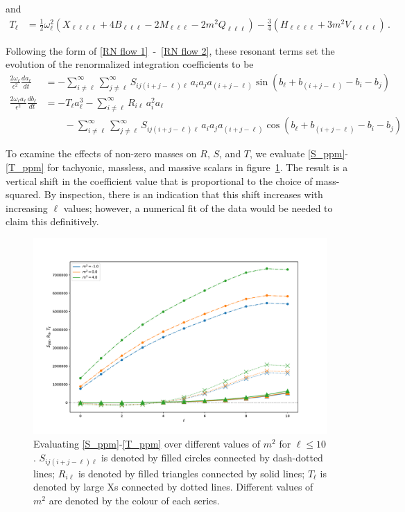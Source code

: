 \documentclass[letterpaper,11pt]{article}
\newcommand{\ol}{\omega_\ell}
\begin{document}
and
\begin{align}
\label{T_ppm}
T_{\ell} &= \frac{1}{2} \ol^2 \left( X_{\ell \ell \ell \ell} + 4 B_{\ell \ell \ell} -2 M_{\ell \ell \ell} - 2m^2 Q_{\ell \ell \ell} \right) -\frac{3}{4} \left( H_{\ell \ell \ell \ell} + 3m^2 V_{\ell \ell \ell \ell} \right) \, .
\end{align}

Following the form of \eqref{RN flow 1}~-~\eqref{RN flow 2}, these resonant terms set the evolution of the renormalized integration coefficients to be \cite{1412.3249}
\begin{align}
\frac{2 \ol}{\epsilon^2} \frac{d a_\ell}{d t} &= -  \sum_{i \neq \ell}^\infty \sum_{j \neq \ell}^\infty S_{i j (i + j - \ell) \ell} \, a_i a_j a_{(i + j - \ell)} \sin ( b_\ell + b_{(i+j-\ell)} - b_i - b_j ) \\
\frac{2 \ol a_\ell}{\epsilon^2} \frac{d b_\ell}{d t} &= - T_\ell a_\ell^3 - \sum^\infty_{i \neq \ell} R_{i\ell} \, a_i^2 a_\ell \nonumber \\
%
& \qquad - \sum_{i \neq \ell}^\infty \sum_{j \neq \ell}^\infty S_{i j (i + j - \ell) \ell} \, a_i a_j a_{(i + j - \ell)} \cos( b_\ell + b_{(i+j-\ell)} - b_i - b_j )
\end{align}

To examine the effects of non-zero masses on $R$, $S$, and $T$, we evaluate \eqref{S_ppm}-\eqref{T_ppm} for tachyonic, massless, and massive scalars in figure~\ref{fig: Nmodes}. The result is a vertical shift in the coefficient value that is proportional to the choice of mass-squared. By inspection, there is an indication that this shift increases with increasing $\ell$ values; however, a numerical fit of the data would be needed to claim this definitively. 

\begin{figure}
\centering
	\includegraphics[width=\textwidth]{./figures/Nmodesplot}
	\caption{Evaluating \eqref{S_ppm}-\eqref{T_ppm} over different values of $m^2$ for $\ell \leq 10$. $S_{ij(i+j-\ell)\ell}$ is denoted by filled circles connected by dash-dotted lines; $R_{i\ell}$ is denoted by filled triangles connected by solid lines; $T_{\ell}$ is denoted by large Xs connected by dotted lines. Different values of $m^2$ are denoted by the colour of each series.}
	\label{fig: Nmodes}
\end{figure}
\end{document}
